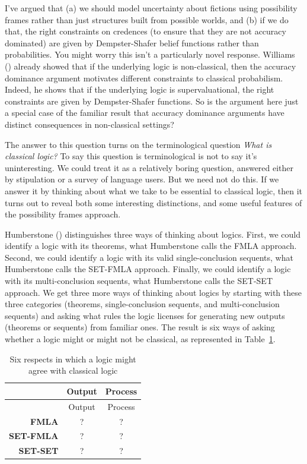 \documentclass[
  11pt,
  letterpaper,
  DIV=11,
  numbers=noendperiod,
  twoside]{scrartcl}
\begin{document}
I've argued that (a) we should model uncertainty about fictions using
possibility frames rather than just structures built from possible
worlds, and (b) if we do that, the right constraints on credences (to
ensure that they are not accuracy dominated) are given by
Dempster-Shafer belief functions rather than probabilities. You might
worry this isn't a particularly novel response. Williams
() already showed that if the
underlying logic is non-classical, then the accuracy dominance argument
motivates different constraints to classical probabilism. Indeed, he
shows that if the underlying logic is supervaluational, the right
constraints are given by Dempster-Shafer functions. So is the argument
here just a special case of the familiar result that accuracy dominance
arguments have distinct consequences in non-classical settings?

The answer to this question turns on the terminological question
\emph{What is classical logic?} To say this question is terminological
is not to say it's uninteresting. We could treat it as a relatively
boring question, answered either by stipulation or a survey of language
users. But we need not do this. If we answer it by thinking about what
we take to be essential to classical logic, then it turns out to reveal
both some interesting distinctions, and some useful features of the
possibility frames approach.

Humberstone () distinguishes three
ways of thinking about logics. First, we could identify a logic with its
theorems, what Humberstone calls the FMLA approach. Second, we could
identify a logic with its valid single-conclusion sequents, what
Humberstone calls the SET-FMLA approach. Finally, we could identify a
logic with its multi-conclusion sequents, what Humberstone calls the
SET-SET approach. We get three more ways of thinking about logics by
starting with these three categories (theorems, single-conclusion
sequents, and multi-conclusion sequents) and asking what rules the logic
licenses for generating new outputs (theorems or sequents) from familiar
ones. The result is six ways of asking whether a logic might or might
not be classical, as represented in Table~\ref{tbl-classical-open}.

\begin{longtable}[]{@{}rcc@{}}
\caption{Six respects in which a logic might agree with classical
logic}\label{tbl-classical-open}\tabularnewline
\toprule\noalign{}
& Output & Process \\
\midrule\noalign{}
\endfirsthead
\toprule\noalign{}
& Output & Process \\
\midrule\noalign{}
\endhead
\bottomrule\noalign{}
\endlastfoot
\textbf{FMLA} & ? & ? \\
\textbf{SET-FMLA} & ? & ? \\
\textbf{SET-SET} & ? & ? \\
\end{longtable}
\end{document}
